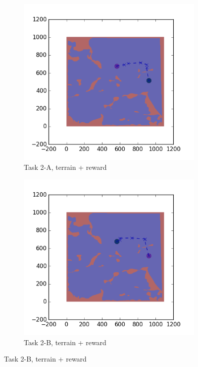 \documentclass{tamuccthesis}
\begin{document}
\begin{figure}
    \begin{subfigure}[b]{0.4\textwidth}
        \centering
        \includegraphics[width=\textwidth,trim={4cm 3cm 2cm 3cm},clip]{EXP3RG_PathBa_-1_-1_0_-1.png}
        \caption{Task 2-A, terrain + reward}
        \label{fig:Path_2-A_terrain_reward}
    \end{subfigure}
    \hfill
    \begin{subfigure}[b]{0.4\textwidth}  
        \centering 
        \includegraphics[width=\textwidth,trim={4cm 3cm 2cm 3cm},clip]{EXP3RG_PathBb_-1_-1_0_-1.png}
        \caption{Task 2-B, terrain + reward}
        \label{fig:Path_2-B_terrain_reward}
    \end{subfigure}
    

\end{figure}
\end{document}
